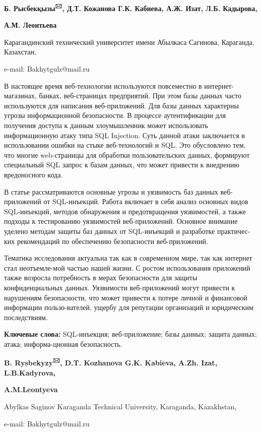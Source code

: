 \begin{center}
{\bfseries Б. Рысбекқызы\textsuperscript{🖂}, Д.Т. Кожанова Г.К. Кабиева,
А.Ж. Изат, Л.Б. Кадырова,}

{\bfseries А.М. Леонтьева}

Карагандинский технический университет имени Абылкаса Сагинова,
Караганда, Казахстан,

e-mail: Bakhytgulz@mail.ru
\end{center}

В настоящее время веб-технологии используются повсеместно в
интернет-магазинах, банках, веб-страницах предприятий. При этом базы
данных часто используются для написания веб-приложений. Для базы данных
характерны угрозы информационной безопасности. В процессе аутентификации
для получения доступа к данным злоумышленник может использовать
информационную атаку типа SQL Injection. Суть данной атаки заключается в
использовании ошибки на стыке веб-технологий и SQL. Это обусловлено тем,
что многие web-страницы для обработки пользовательских данных, формируют
специальный SQL запрос к базам данных, что может привести к внедрению
вредоносного кода.

В статье рассматриваются основные угрозы и уязвимость баз данных
веб-приложений от SQL-инъекций. Работа включает в себя анализ основных
видов SQL-инъекций, методов обнаружения и предотвращения уязвимостей, а
также подходы к тестированию уязвимостей веб-приложений. Основное
внимание уделено методам защиты баз данных от SQL-инъекций и разработке
практичес-ких рекомендаций по обеспечению безопасности веб-приложений.

Тематика исследования актуальна так как в современном мире, так как
интернет стал неотъемле-мой частью нашей жизни. С ростом использования
приложений также возросла потребность в мерах безопасности для защиты
конфиденциальных данных. Уязвимости веб-приложений могут привести к
нарушениям безопасности, что может привести к потере личной и финансовой
информации пользо-вателей, ущербу для репутации организаций и юридическим
последствиям.

{\bfseries Ключевые слова:} SQL-инъекция; веб-приложение; базы данных;
защита данных; атака; информа-ционная безопасность.


\begin{center}
{\bfseries B. Rysbekyzy\textsuperscript{🖂}, D.T. Kozhanova G.K. Kabieva,
A.Zh. Izat, L.B.Kadyrova,}

{\bfseries A.M.Leontyeva}

Abylkas Saginov Karaganda Technical University, Karaganda, Kazakhstan,

e-mail: Bakhytgulz@mail.ru
\end{center}

